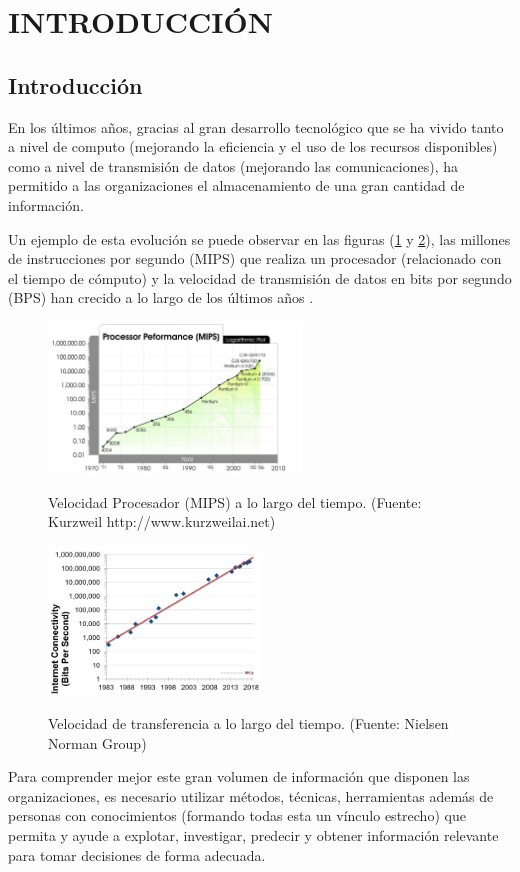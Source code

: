 
\section{INTRODUCCIÓN}
\subsection{Introducción}
En los últimos años, gracias al gran desarrollo tecnológico que se ha vivido tanto a nivel de computo (mejorando la eficiencia y el uso de los recursos disponibles) como a nivel de transmisión de datos (mejorando las comunicaciones), ha permitido a las organizaciones el almacenamiento de una gran cantidad de información.

Un ejemplo de esta evolución se puede observar en las figuras (\ref{fig:procPerformance} y \ref{fig:bandwidth-growth}), las millones de instrucciones por segundo (MIPS) que realiza un procesador (relacionado con el tiempo de cómputo) y la velocidad de transmisión de datos en bits por segundo (BPS) han crecido a lo largo de los últimos años \cite{Nielsen2018}.

\begin{figure}[htb]
	\centering
	\caption{Velocidad Procesador (MIPS) a lo largo del tiempo. (Fuente: Kurzweil http://www.kurzweilai.net)}
	\includegraphics[width=0.6\textwidth]{recursos/processor_performance}
	\label{fig:procPerformance}
\end{figure}
\FloatBarrier
\begin{figure}[htb]
	\centering
\caption{Velocidad de transferencia a lo largo del tiempo. (Fuente: Nielsen Norman Group)}
\includegraphics[width=0.5\textwidth]{recursos/bandwidth-growth-nielsen-law}
\label{fig:bandwidth-growth}
\end{figure}
\FloatBarrier
Para comprender mejor este gran volumen de información que disponen las organizaciones, es necesario utilizar métodos, técnicas, herramientas además de personas con conocimientos (formando todas esta un vínculo estrecho) que permita y ayude a explotar, investigar, predecir y obtener información relevante para tomar decisiones de forma adecuada.

